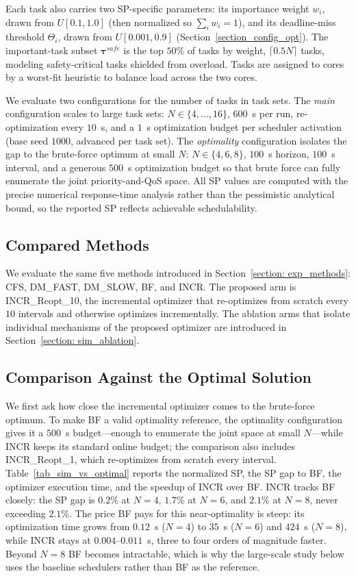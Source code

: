 Each task also carries two SP-specific parameters: its importance weight $w_i$, drawn from $U[0.1, 1.0]$
(then normalized so $\sum_i w_i = 1$), and its deadline-miss threshold $\Theta_i$, drawn from
$U[0.001, 0.9]$ (Section~\ref{section_config_opt}).
The important-task subset $\boldsymbol{\tau}^{safe}$ is the top $50\%$ of tasks by weight, $\lceil 0.5 N \rceil$
tasks, modeling safety-critical tasks shielded from overload.
Tasks are assigned to cores by a worst-fit heuristic to balance load across the two cores.

We evaluate two configurations for the number of tasks in task sets.
The \emph{main} configuration scales to large task sets: $N \in \{4,\dots,16\}$, $600$~s per run,
re-optimization every $10$~s, and a $1$~s optimization budget per scheduler activation
(base seed $1000$, advanced per task set).
The \emph{optimality} configuration isolates the gap to the brute-force optimum at small $N$:
$N \in \{4,6,8\}$, $100$~s horizon, $100$~s interval, and a generous $500$~s optimization budget so that
brute force can fully enumerate the joint priority-and-QoS space.
All SP values are computed with the precise numerical response-time analysis rather than the pessimistic
analytical bound, so the reported SP reflects achievable schedulability.

\subsection{Compared Methods}
\label{section: sim_compared_methods}

We evaluate the same five methods introduced in Section~\ref{section: exp_methods}:
CFS, DM\_FAST, DM\_SLOW, BF, and INCR.
The proposed arm is INCR\_Reopt\_10, the incremental optimizer that re-optimizes from
scratch every $10$ intervals and otherwise optimizes incrementally.
The ablation arms that isolate individual mechanisms of the proposed optimizer
are introduced in Section~\ref{section: sim_ablation}.

\subsection{Comparison Against the Optimal Solution}
\label{section: sim_vs_optimal}

We first ask how close the incremental optimizer comes to the brute-force optimum.
To make BF a valid optimality reference, the optimality configuration gives it a $500$~s budget---enough
to enumerate the joint space at small $N$---while INCR keeps its standard online budget;
the comparison also includes INCR\_Reopt\_1, which re-optimizes from scratch every interval.
Table~\ref{tab_sim_vs_optimal} reports the normalized SP, the SP gap to BF, the optimizer
execution time, and the speedup of INCR over BF.
INCR tracks BF closely: the SP gap is $0.2\%$ at $N{=}4$, $1.7\%$ at $N{=}6$, and $2.1\%$ at
$N{=}8$, never exceeding $2.1\%$.
The price BF pays for this near-optimality is steep: its optimization time grows from $0.12$~s
($N{=}4$) to $35$~s ($N{=}6$) and $424$~s ($N{=}8$), while INCR stays at $0.004$--$0.011$~s,
three to four orders of magnitude faster.
Beyond $N{=}8$ BF becomes intractable, which is why the large-scale study below uses the baseline
schedulers rather than BF as the reference.

